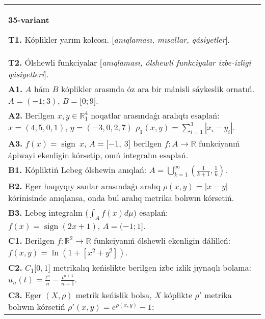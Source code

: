\documentclass{article}
\DeclareMathOperator{\sign}{sign}
\begin{document}
\begin{tabular}{m{17cm}}
\textbf{35-variant}
\newline

\textbf{T1.} Kóplikler yarım kolcosı. [\textit{anıqlaması, mısallar, qásiyetler}]. \\
\textbf{T2.} Ólshewli funkciyalar [\textit{anıqlaması, ólshewli funkciyalar izbe-izligi qásiyetleri}]. \\
\textbf{A1.} \(A\) hám \(B\) kóplikler arasında óz ara bir mánisli sáykeslik ornatıń. \(A = ( - 1;3)\), \(B = \lbrack 0;9\rbrack\). \\
\textbf{A2.} Berilgen \(x,y \in \mathbb{R}_1^{4}\) noqatlar arasındaǵı aralıqtı esaplań: \(x = (4,5,0,1)\), \(y = ( - 3,0,2,7)\) \(\rho_{1}(x,y) = \sum_{i = 1}^{3}\left| x_{i} - y_{i} \right|\). \\
\textbf{A3.} \(f(x) = \sign \ x\), \(A = \lbrack - 1,\ 3\rbrack\) berilgen \(f:A\rightarrow\mathbb{R}\) funkciyanıń ápiwayi ekenligin kórsetip, onıń integralın esaplań. \\
\textbf{B1.} Kópliktiń Lebeg ólshewin anıqlań: \(A = \bigcup_{k = 1}^{\infty}\left( \frac{1}{k + 1},\frac{1}{k} \right)\). \\
\textbf{B2.} Eger haqıyqıy sanlar arasındaǵı aralıq \(\rho(x,y) = |x - y|\) kórinisinde anıqlansa, onda bul aralıq metrika bolıwın kórsetiń. \\
\textbf{B3.} Lebeg integralın (\(\int_{A}^{}{f(x)d\mu}\)) esaplań: \(f(x) = \sign(2x + 1)\), \(A = ( - 1;1\rbrack\). \\
\textbf{C1.} Berilgen \(f:\mathbb{R}^{2}\mathbb{\rightarrow R}\) funkciyanıń ólshewli ekenligin dálilleń: \(f(x,y) = \ln\left( 1 + \left\lbrack x^{2} + y^{2} \right\rbrack \right)\). \\
\textbf{C2.} \(C_{1}\lbrack 0,1\rbrack\) metrikalıq keńislikte berilgen izbe izlik jıynaqlı bolama: \(u_{n}(t) = \frac{t^{n}}{n} - \frac{t^{n + 1}}{n + 1}\). \\
\textbf{C3.} Eger \((X,\rho)\) metrik keńislik bolsa, \(X\) kóplikte \(\rho'\) metrika bolıwın kórsetiń \(\rho'(x,y) = e^{\rho(x,y)} - 1\); \\

\end{tabular}
\vspace{1cm}
\end{document}
